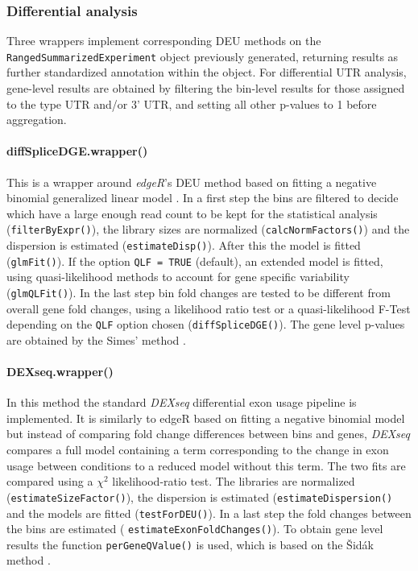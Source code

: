 \documentclass{bmcart}
\begin{document}
\subsubsection{Differential analysis}
\label{sec:DE}
Three wrappers implement corresponding DEU methods on the \linebreak \texttt{RangedSummarizedExperiment} object previously generated, returning results as further standardized annotation within the object. For differential UTR analysis, gene-level results are obtained by filtering the bin-level results for those assigned to the type UTR and/or 3' UTR, and setting all other p-values to 1 before aggregation.

\paragraph{diffSpliceDGE.wrapper()}

This is a wrapper around \textit{edgeR}'s DEU method based on fitting a negative binomial generalized linear model \cite{Robinson2009EdgeR:Data}. In a first step the bins are filtered to decide which have a large enough read count to be kept for the statistical analysis (\texttt{filterByExpr()}), the library sizes are normalized (\texttt{calcNormFactors()}) and the dispersion is estimated (\texttt{estimateDisp()}). After this the model is fitted (\texttt{glmFit()}). If the option \texttt{QLF = TRUE} (default), an extended model is fitted, using quasi-likelihood methods to account for gene specific variability (\texttt{glmQLFit()}). In the last step bin fold changes are tested to be different from overall gene fold changes, using a likelihood ratio test or a quasi-likelihood F-Test depending on the \texttt{QLF} option chosen (\texttt{diffSpliceDGE()}).  The gene level p-values are obtained by the Simes' method \cite{Simes1986AnSignificance}. 
\paragraph{DEXseq.wrapper()}

In this method the standard \textit{DEXseq} differential exon usage pipeline \cite{Anders2012DetectingData} is implemented. It is similarly to edgeR based on fitting a negative binomial model but instead of comparing fold change differences between bins and genes, \textit{DEXseq} compares a full model containing a term corresponding to the change in exon usage between conditions to a reduced model without this term. The two fits are compared using a $\chi^2$ likelihood-ratio test. The libraries are normalized (\texttt{estimateSizeFactor()}), the dispersion is estimated (\texttt{estimateDispersion()} and the models are fitted (\texttt{testForDEU()}). In a last step the fold changes between the bins are estimated ( \texttt{estimateExonFoldChanges()}). To obtain gene level results the function \texttt{perGeneQValue()} is used, which is based on the Šidák method \cite{Sidak1967RectangularDistributions}.
\end{document}
